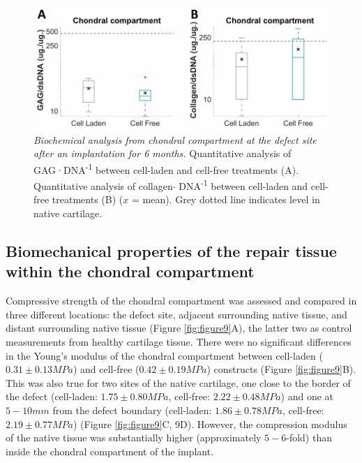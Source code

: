 \documentclass[twocolumn, serif, empirical, authordate, seplic]{jote-article}
\begin{document}
\begin{figure}
\centering \includegraphics[width=\columnwidth]{articles/empirical/horse/media/image8.jpg}
\caption{\emph{Biochemical analysis from chondral compartment at the defect site after an implantation for 6 months.} Quantitative analysis of GAG·DNA\textsuperscript{-1} between cell-laden and cell-free treatments (A). Quantitative analysis of collagen$\cdot$ DNA\textsuperscript{-1} between cell-laden and cell-free treatments (B) ($x$ = mean). Grey dotted line indicates level in native cartilage.}
\label{fig:figure8}\end{figure}


 {}\subsection*{Biomechanical properties of the repair tissue within the chondral compartment} 

Compressive strength of the chondral compartment was assessed and compared in three different locations: the defect site, adjacent surrounding native tissue, and distant surrounding native tissue (Figure \ref{fig:figure9}A), the latter two as control measurements from healthy cartilage tissue. There were no significant differences in the Young's modulus of the chondral compartment between cell-laden ($0.31 \pm 0.13 MPa$) and cell-free ($0.42 \pm 0.19 MPa$) constructs (Figure \ref{fig:figure9}B). This was also true for two sites of the native cartilage, one close to the border of the defect (cell-laden: $1.75 \pm 0.80 MPa$, cell-free: $2.22 \pm 0.48 MPa$) and one at $5 - 10 mm$ from the defect boundary (cell-laden: $1.86 \pm 0.78 MPa$, cell-free: $2.19 \pm 0.77 MPa$) (Figure \ref{fig:figure9}C, 9D). However, the compression modulus of the native tissue was substantially higher (approximately $5-6$-fold) than inside the chondral compartment of the implant.
\end{document}
